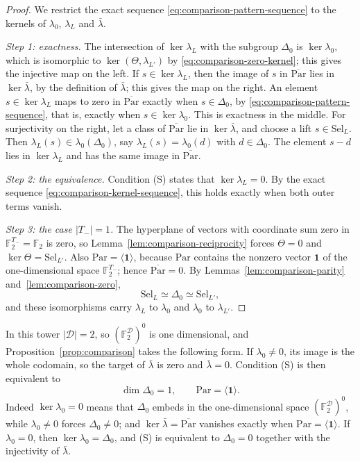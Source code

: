 \documentclass[11pt]{article}
\theoremstyle{plain}
\theoremstyle{definition}
\theoremstyle{remark}
\newcommand{\F}{\mathbb F}
\begin{document}
\begin{proof}
We restrict the exact sequence \eqref{eq:comparison-pattern-sequence} to
the kernels of $\lambda_0$, $\lambda_L$ and $\bar\lambda$.

\emph{Step 1: exactness.}  The intersection of $\ker\lambda_L$ with the
subgroup $\Delta_0$ is $\ker\lambda_0$, which is isomorphic to
$\ker(\Theta,\lambda_{L'})$ by \eqref{eq:comparison-zero-kernel}; this
gives the injective map on the left.  If $s\in\ker\lambda_L$, then the
image of $s$ in $\overline{\mathrm{Par}}$ lies in $\ker\bar\lambda$, by the
definition of $\bar\lambda$; this gives the map on the right.  An element
$s\in\ker\lambda_L$ maps to zero in $\overline{\mathrm{Par}}$ exactly when
$s\in\Delta_0$, by \eqref{eq:comparison-pattern-sequence}, that is, exactly
when $s\in\ker\lambda_0$.  This is exactness in the middle.  For
surjectivity on the right, let a class of $\overline{\mathrm{Par}}$ lie in
$\ker\bar\lambda$, and choose a lift $s\in\mathrm{Sel}_L$.  Then
$\lambda_L(s)\in\lambda_0(\Delta_0)$, say $\lambda_L(s)=\lambda_0(d)$ with
$d\in\Delta_0$.  The element $s-d$ lies in $\ker\lambda_L$ and has the same
image in $\overline{\mathrm{Par}}$.

\emph{Step 2: the equivalence.}  Condition (S) states that
$\ker\lambda_L=0$.  By the exact sequence \eqref{eq:comparison-kernel-sequence},
this holds exactly when both outer terms vanish.

\emph{Step 3: the case $|T_-|=1$.}  The hyperplane of vectors with
coordinate sum zero in $\F_2^{T_-}=\F_2$ is zero, so
Lemma~\ref{lem:comparison-reciprocity} forces $\Theta=0$ and
$\ker\Theta=\mathrm{Sel}_{L'}$.  Also $\mathrm{Par}=\langle\mathbf1\rangle$,
because $\mathrm{Par}$ contains the nonzero vector $\mathbf1$ of the
one-dimensional space $\F_2^{T_-}$; hence $\overline{\mathrm{Par}}=0$.  By
Lemmas~\ref{lem:comparison-parity} and~\ref{lem:comparison-zero},
\[
 \mathrm{Sel}_L\simeq\Delta_0\simeq \mathrm{Sel}_{L'},
\]
and these isomorphisms carry $\lambda_L$ to $\lambda_0$ and $\lambda_0$ to
$\lambda_{L'}$.
\end{proof}

In this tower $|\mathcal D|=2$, so $(\F_2^{\mathcal D})^0$ is one
dimensional, and Proposition~\ref{prop:comparison} takes the following
form.  If $\lambda_0\ne0$, its image is the whole codomain, so the target
of $\bar\lambda$ is zero and $\bar\lambda=0$.  Condition (S) is then
equivalent to
\[
 \dim\Delta_0=1,\qquad
 \mathrm{Par}=\langle\mathbf1\rangle.
\]
Indeed $\ker\lambda_0=0$ means that $\Delta_0$ embeds in the
one-dimensional space $(\F_2^{\mathcal D})^0$, while $\lambda_0\ne0$ forces
$\Delta_0\ne0$; and $\ker\bar\lambda=\overline{\mathrm{Par}}$ vanishes
exactly when $\mathrm{Par}=\langle\mathbf1\rangle$.  If $\lambda_0=0$, then
$\ker\lambda_0=\Delta_0$, and (S) is equivalent to $\Delta_0=0$ together
with the injectivity of $\bar\lambda$.
\end{document}
